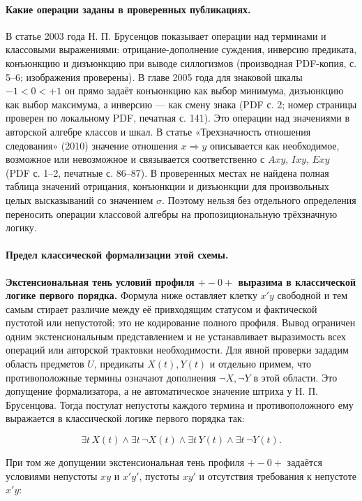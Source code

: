 \documentclass[12pt,a4paper]{article}
\begin{document}
\paragraph{Какие операции заданы в проверенных публикациях.} В статье 2003 года Н. П. Брусенцов показывает операции над терминами и классовыми выражениями: отрицание-дополнение суждения, инверсию предиката, конъюнкцию и дизъюнкцию при выводе силлогизмов (производная PDF-копия, с. 5–6; изображения проверены). В главе 2005 года для знаковой шкалы \(-1<0<+1\) он прямо задаёт конъюнкцию как выбор минимума, дизъюнкцию как выбор максимума, а инверсию — как смену знака (PDF с. 2; номер страницы проверен по локальному PDF, печатная с. 141). Это операции над значениями в авторской алгебре классов и шкал. В статье «Трехзначность отношения следования» (2010) значение отношения \(x\Rightarrow y\) описывается как необходимое, возможное или невозможное и связывается соответственно с \(Axy\), \(Ixy\), \(Exy\) (PDF с. 1–2, печатные с. 86–87). В проверенных местах не найдена полная таблица значений отрицания, конъюнкции и дизъюнкции для произвольных целых высказываний со значением \(\sigma\). Поэтому нельзя без отдельного определения переносить операции классовой алгебры на пропозициональную трёхзначную логику.

\paragraph{Предел классической формализации этой схемы.} \textbf{Экстенсиональная тень условий профиля \(+-0+\) выразима в классической логике первого порядка.} Формула ниже оставляет клетку \(x'y\) свободной и тем самым стирает различие между её привходящим статусом и фактической пустотой или непустотой; это не кодирование полного профиля. Вывод ограничен одним экстенсиональным представлением и не устанавливает выразимость всех операций или авторской трактовки необходимости. Для явной проверки зададим область предметов \(U\), предикаты \(X(t),Y(t)\) и отдельно примем, что противоположные термины означают дополнения \(\neg X,\neg Y\) в этой области. Это допущение формализатора, а не автоматическое значение штриха у Н. П. Брусенцова. Тогда постулат непустоты каждого термина и противоположного ему выражается в классической логике первого порядка так:

\[
\exists t\,X(t)\land\exists t\,\neg X(t)\land\exists t\,Y(t)\land\exists t\,\neg Y(t).
\]

При том же допущении экстенсиональная тень профиля \(+-0+\) задаётся условиями непустоты \(xy\) и \(x'y'\), пустоты \(xy'\) и отсутствия требования к непустоте \(x'y\):
\end{document}
